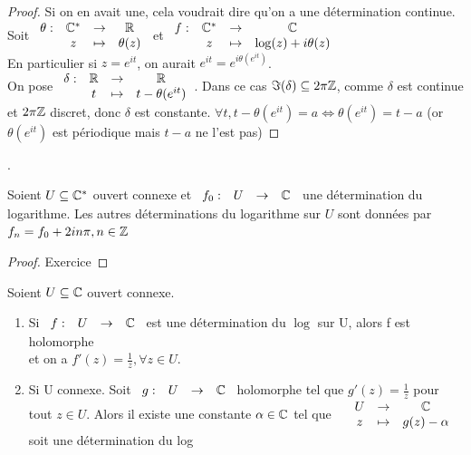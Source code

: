 \documentclass[]{report}
\begin{document}
\begin{proof}{}{}
    Si on en avait une, cela voudrait dire qu'on a une détermination continue.\\ Soit $\begin{array}{ccccc}
\theta : & \mathbb{C}^* & \to & \mathbb{R} \\
  & z & \mapsto & \theta(z)
\end{array}$ et $\begin{array}{ccccc}
f : & \mathbb{C}^* & \to & \mathbb{C} \\
  & z & \mapsto & \log(z)+i\theta(z)
\end{array}$\\
En particulier si $z=e^{it}$, on aurait $e^{it}=e^{i\theta(e^{it})}$.\\
On pose $\begin{array}{ccccc}
\delta : & \mathbb{R} & \to & \mathbb{R} \\
  & t & \mapsto & t-\theta(e^{it})
\end{array}$. Dans ce cas $\Im(\delta)\subseteq2\pi\mathbb{Z}$, comme $\delta$ est continue et $2\pi\mathbb{Z}$ discret, donc $\delta$ est constante. $\forall t, t-\theta(e^{it})=a\iff \theta(e^{it})=t-a$ (or $\theta(e^{it})$ est périodique mais $t-a$ ne l'est pas)
\end{proof}.

\begin{prop}{}{}
    Soient $U\subseteq \mathbb{C}^*$ ouvert connexe et $\begin{array}{ccccc}
f_0 : & U & \to & \mathbb{C} \\
\end{array}$ une détermination du logarithme. Les autres déterminations du logarithme sur $U$ sont données par $f_n=f_0+2in\pi,n\in\mathbb{Z}$
\end{prop}

\begin{proof}{}{}
    Exercice
\end{proof}

\begin{prop}{}{}
    Soient $U\subseteq\mathbb{C}$ ouvert connexe.
    \begin{enumerate}
        \item Si $\begin{array}{ccccc}
f : & U & \to & \mathbb{C}
\end{array}$ est une détermination du $\log$ sur U, alors f est holomorphe \\et on a $f'(z)=\frac{1}{z},\forall z\in U$.
    \item Si U connexe. Soit $\begin{array}{ccccc}
g : & U & \to & \mathbb{C}
\end{array}$ holomorphe tel que $g'(z)=\frac{1}{z}$ pour tout $z\in U$. Alors il existe une constante $\alpha\in\mathbb{C}$ tel que $\begin{array}{ccccc}
& U & \to & \mathbb{C} \\
& z & \mapsto & g(z)-\alpha
\end{array}$ soit une détermination du log
    \end{enumerate}
\end{prop}
\end{document}

